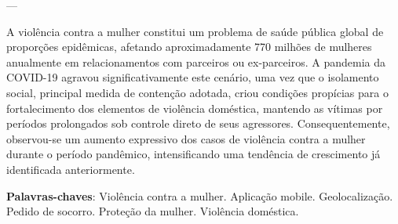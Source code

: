 \documentclass[
	12pt,				    %
	openright,			    %
	oneside,			    %
	a4paper,			    %
    sumario=tradicional,    %
	english,			    %
	brazil,				    %
	]{abntex2}              %
\begin{document}
\frenchspacing

\pretextual

\imprimircapa

\imprimirfolhaderosto




 ---



\begin{resumo}
 \noindent
A violência contra a mulher constitui um problema de saúde pública global de proporções epidêmicas, afetando aproximadamente 770 milhões de mulheres anualmente em relacionamentos com parceiros ou ex-parceiros. A pandemia da COVID-19 agravou significativamente este cenário, uma vez que o isolamento social, principal medida de contenção adotada, criou condições propícias para o fortalecimento dos elementos de violência doméstica, mantendo as vítimas por períodos prolongados sob controle direto de seus agressores. Consequentemente, observou-se um aumento expressivo dos casos de violência contra a mulher durante o período pandêmico, intensificando uma tendência de crescimento já identificada anteriormente.

 \vspace{\onelineskip}

 \noindent
 \textbf{Palavras-chaves}: Violência contra a mulher. Aplicação mobile. Geolocalização. Pedido de socorro. Proteção da mulher. Violência doméstica.
\end{resumo}
\end{document}
